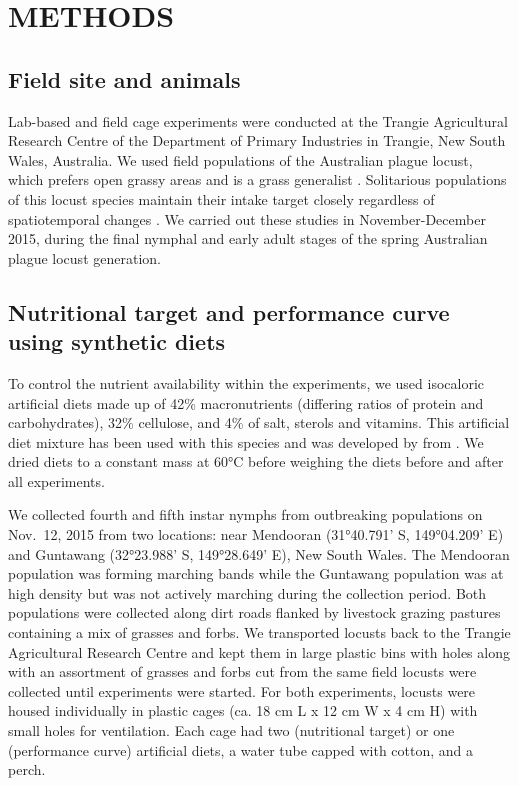 \documentclass[
]{article}
\begin{document}
\section{METHODS}\label{methods}

\subsection{Field site and animals}\label{field-site-and-animals}

Lab-based and field cage experiments were conducted at the Trangie
Agricultural Research Centre of the Department of Primary Industries in
Trangie, New South Wales, Australia. We used field populations of the
Australian plague locust, which prefers open grassy areas and is a grass
generalist \citep{key_general_1945}. Solitarious populations of this
locust species maintain their intake target closely regardless of
spatiotemporal changes \citep{lawton_mismatched_2021}. We carried out
these studies in November-December 2015, during the final nymphal and
early adult stages of the spring Australian plague locust generation.

\subsection{Nutritional target and performance curve using synthetic
diets}\label{nutritional-target-and-performance-curve-using-synthetic-diets}

To control the nutrient availability within the experiments, we used
isocaloric artificial diets made up of 42\% macronutrients (differing
ratios of protein and carbohydrates), 32\% cellulose, and 4\% of salt,
sterols and vitamins. This artificial diet mixture has been used with
this species \citep{clissold_regulation_2014} and was developed by
\citet{simpson_compensation_1985} from \citet{dadd_nutritional_1961}. We
dried diets to a constant mass at 60°C before weighing the diets before
and after all experiments.

We collected fourth and fifth instar nymphs from outbreaking populations
on Nov.~12, 2015 from two locations: near Mendooran (31°40.791' S,
149°04.209' E) and Guntawang (32°23.988' S, 149°28.649' E), New South
Wales. The Mendooran population was forming marching bands while the
Guntawang population was at high density but was not actively marching
during the collection period. Both populations were collected along dirt
roads flanked by livestock grazing pastures containing a mix of grasses
and forbs. We transported locusts back to the Trangie Agricultural
Research Centre and kept them in large plastic bins with holes along
with an assortment of grasses and forbs cut from the same field locusts
were collected until experiments were started. For both experiments,
locusts were housed individually in plastic cages (ca. 18 cm L x 12 cm W
x 4 cm H) with small holes for ventilation. Each cage had two
(nutritional target) or one (performance curve) artificial diets, a
water tube capped with cotton, and a perch.
\end{document}
